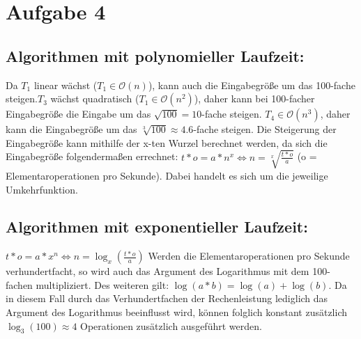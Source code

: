 \documentclass[a4paper,10pt]{article}
\begin{document}
\section{Aufgabe 4}
\subsection{Algorithmen mit polynomieller Laufzeit:}
Da $T_1$ linear wächst ($T_1 \in \mathcal{O}(n)$), kann auch die Eingabegröße um das 100-fache steigen.\newline $T_3$ wächst quadratisch
($T_1 \in \mathcal{O}(n^2)$), daher kann bei 100-facher Eingabegröße die Eingabe um das $\sqrt{100} = 10$-fache steigen. \newline $T_4 \in \mathcal{O}(n^3)$,
daher kann die Eingabegröße um das $\sqrt[3]{100} \approx 4.6$-fache steigen.\newline
Die Steigerung der Eingabegröße kann mithilfe der x-ten Wurzel berechnet werden, da sich die Eingabegröße folgendermaßen errechnet:\newline
$t*o = a*n^x \Leftrightarrow n = \sqrt[x]{\frac{t*o}{a}}$ (o = Elementaroperationen pro Sekunde). Dabei handelt es sich um die jeweilige
Umkehrfunktion.

\subsection{Algorithmen mit exponentieller Laufzeit:}
$t*o = a*x^n \Leftrightarrow n = \log_x(\frac{t*o}{a})$ \newline
Werden die Elementaroperationen pro Sekunde verhundertfacht, so wird auch das Argument des Logarithmus mit dem 100-fachen multipliziert.
Des weiteren gilt:\newline
$\log(a*b) = \log(a) + \log(b)$. Da in diesem Fall durch das Verhundertfachen der Rechenleistung lediglich das Argument des 
Logarithmus beeinflusst wird, können folglich konstant zusätzlich $\log_3(100) \approx 4$ Operationen zusätzlich ausgeführt werden.
\end{document}
